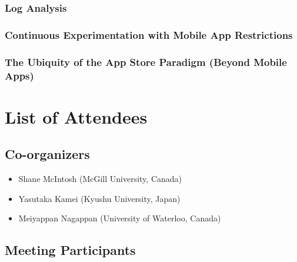\documentclass[a4paper]{article}
\begin{document}
\subsubsection{Log Analysis}

\subsubsection{Continuous Experimentation with Mobile App Restrictions}

\subsubsection{The Ubiquity of the App Store Paradigm (Beyond Mobile Apps)}

\clearpage

\section{List of Attendees}

\subsection{Co-organizers}

\begin{itemize}
\item Shane McIntosh (McGill University, Canada)
\item Yasutaka Kamei (Kyushu University, Japan)
\item Meiyappan Nagappan (University of Waterloo, Canada)
\end{itemize}

\subsection{Meeting Participants}
\end{document}
